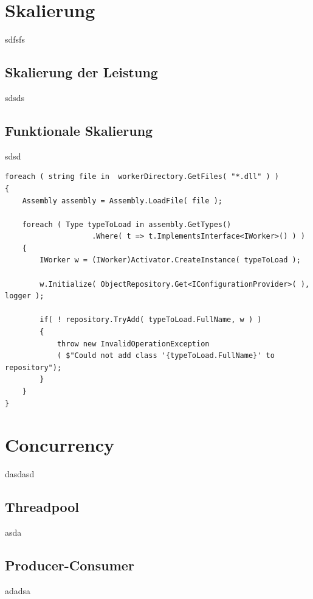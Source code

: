 \section{Skalierung}
sdfsfs
\subsection{Skalierung der Leistung} \label{sec:scaling}
sdsds
\subsection{Funktionale Skalierung} \label{sec:dynload}
sdsd
\begin{lstlisting}[caption={Dynamic Loading, siehe WorkerRepository.cs - LoadAllWorkers()},label={lst:dynamicloading},captionpos=b]
foreach ( string file in  workerDirectory.GetFiles( "*.dll" ) )
{
	Assembly assembly = Assembly.LoadFile( file );

	foreach ( Type typeToLoad in assembly.GetTypes()
					.Where( t => t.ImplementsInterface<IWorker>() ) )
	{
		IWorker w = (IWorker)Activator.CreateInstance( typeToLoad );

		w.Initialize( ObjectRepository.Get<IConfigurationProvider>( ), logger );

		if( ! repository.TryAdd( typeToLoad.FullName, w ) )
		{
			throw new InvalidOperationException
			( $"Could not add class '{typeToLoad.FullName}' to repository");
		}
	}
}
\end{lstlisting}
\section{Concurrency}
dasdasd
\subsection{Threadpool}
asda
\subsection{Producer-Consumer}
adadsa
